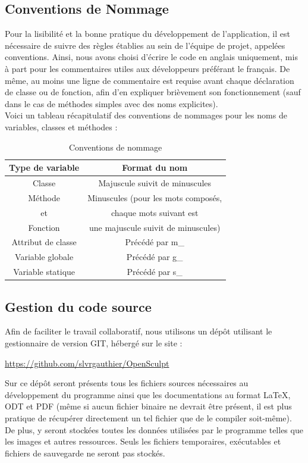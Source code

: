 \documentclass[a4paper]{memoir}
\begin{document}
			\subsection{Conventions de Nommage}
				Pour la lisibilité et la bonne pratique du développement de l'application, il est nécessaire de suivre des règles établies au sein de 
				l'équipe de projet, appelées conventions. Ainsi, nous avons choisi d'écrire le code en anglais uniquement, mis à part pour les commentaires 
				utiles aux développeurs préférant le français. De même, au moins une ligne de commentaire est requise avant chaque déclaration de classe ou 
				de fonction, afin d'en expliquer brièvement son fonctionnement (sauf dans le cas de méthodes simples avec des noms explicites).\\
				Voici un tableau récapitulatif des conventions de nommages pour les noms de variables, classes et méthodes :
				\begin{table}[H]
					\begin{small}
						\hspace{1,5cm}
						\begin{tabular}{| c | c |}
							\hline
							\textbf{Type de variable} & \textbf{Format du nom}\\
							\hline
							Classe & Majuscule suivit de minuscules\\
							\hline
							Méthode & Minuscules (pour les mots composés,\\
							et & chaque mots suivant est\\
							Fonction & une majuscule suivit de minuscules)\\
							\hline
							Attribut de classe & Précédé par m\_\\
							\hline
							Variable globale & Précédé par g\_\\
							\hline
							Variable statique & Précédé par s\_\\
							\hline
						\end{tabular}
					\end{small}
					\label{tab:nommage}
					\caption{Conventions de nommage}
				\end{table}

			\subsection{Gestion du code source}
				Afin de faciliter le travail collaboratif, nous utilisons un dépôt utilisant le gestionnaire de version GIT, hébergé sur le site :
				\begin{center}
					\url{https://github.com/slvrgauthier/OpenSculpt}
					\label{url:github}
				\end{center}
				Sur ce dépôt seront présents tous les fichiers sources nécessaires au développement du programme ainsi que les documentations au format 
				\LaTeX, ODT et PDF (même si aucun fichier binaire ne devrait être présent, il est plus pratique de récupérer directement un tel fichier 
				que de le compiler soit-même). De plus, y seront stockées toutes les données utilisées par le programme telles que les images et autres 
				ressources. Seuls les fichiers temporaires, exécutables et fichiers de sauvegarde ne seront pas stockés.
\end{document}
